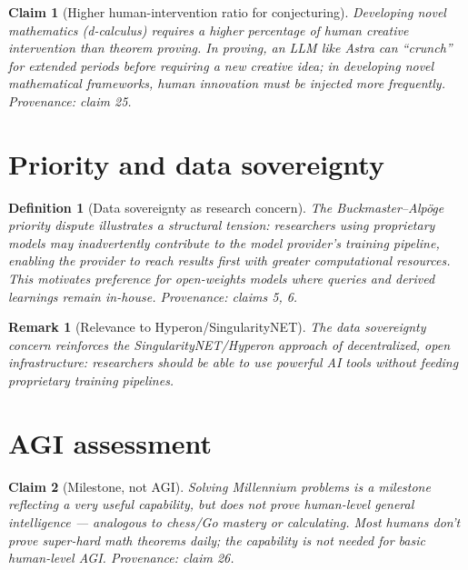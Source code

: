 \documentclass[11pt]{article}
\newtheorem{definition}{Definition}
\newtheorem{claim}{Claim}
\newtheorem{remark}{Remark}
\begin{document}
\begin{claim}[Higher human-intervention ratio for conjecturing]\label{cl:intervention}
Developing novel mathematics (d-calculus) requires a higher percentage of
human creative intervention than theorem proving.  In proving, an LLM like
Astra can ``crunch'' for extended periods before requiring a new creative
idea; in developing novel mathematical frameworks, human innovation must
be injected more frequently.
\emph{Provenance: claim 25.}
\end{claim}


\section{Priority and data sovereignty}

\begin{definition}[Data sovereignty as research concern]\label{def:datasov}
The Buckmaster--Alp\"oge priority dispute illustrates a structural tension:
researchers using proprietary models may inadvertently contribute to the
model provider's training pipeline, enabling the provider to reach results
first with greater computational resources.  This motivates preference for
open-weights models where queries and derived learnings remain in-house.
\emph{Provenance: claims 5, 6.}
\end{definition}

\begin{remark}[Relevance to Hyperon/SingularityNET]
The data sovereignty concern reinforces the SingularityNET/Hyperon approach
of decentralized, open infrastructure: researchers should be able to use
powerful AI tools without feeding proprietary training pipelines.
\end{remark}


\section{AGI assessment}

\begin{claim}[Milestone, not AGI]\label{cl:milestone}
Solving Millennium problems is a milestone reflecting a very useful
capability, but does not prove human-level general intelligence ---
analogous to chess/Go mastery or calculating.  Most humans don't prove
super-hard math theorems daily; the capability is not needed for basic
human-level AGI.
\emph{Provenance: claim 26.}
\end{claim}
\end{document}
